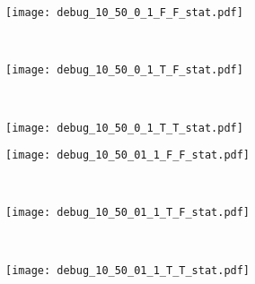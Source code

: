 \documentclass[a4paper]{article}
\begin{document}
\begin{figure}
        \centering
        \begin{subfigure}[b]{0.3\textwidth}
                \centering
                \texttt{[image: debug\_10\_50\_0\_1\_F\_F\_stat.pdf]}
                \caption{}
                \label{fig:costsA}
        \end{subfigure}%
        ~ %
        \begin{subfigure}[b]{0.3\textwidth}
                \centering
                \texttt{[image: debug\_10\_50\_0\_1\_T\_F\_stat.pdf]}
                \caption{}
                \label{fig:costsB}
        \end{subfigure}
        ~ %
        \begin{subfigure}[b]{0.3\textwidth}
                \centering
                \texttt{[image: debug\_10\_50\_0\_1\_T\_T\_stat.pdf]}
                \caption{}
                \label{fig:costsC}
        \end{subfigure}

        \begin{subfigure}[b]{0.3\textwidth}
                \centering
                \texttt{[image: debug\_10\_50\_01\_1\_F\_F\_stat.pdf]}
                \caption{}
                \label{fig:costsD}
        \end{subfigure}%
        ~ %
        \begin{subfigure}[b]{0.3\textwidth}
                \centering
                \texttt{[image: debug\_10\_50\_01\_1\_T\_F\_stat.pdf]}
                \caption{}
                \label{fig:costsE}
        \end{subfigure}
        ~ %
        \begin{subfigure}[b]{0.3\textwidth}
                \centering
                \texttt{[image: debug\_10\_50\_01\_1\_T\_T\_stat.pdf]}
                \caption{}
                \label{fig:costsF}
        \end{subfigure}


\end{figure}
\end{document}

